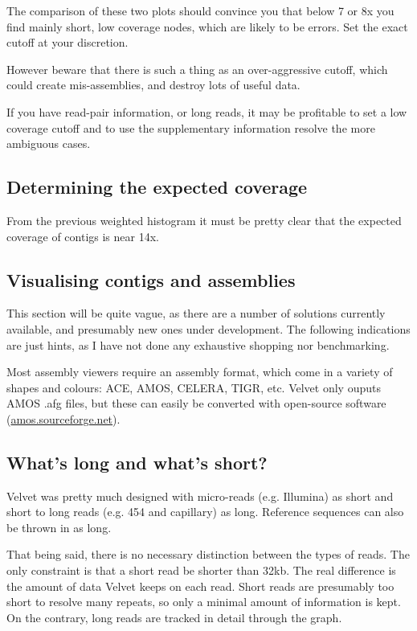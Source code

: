 \documentclass{article}
\begin{document}
The comparison of these two plots should convince you that below 7 or 8x you find mainly short, low coverage nodes, which are likely to be errors. Set the exact cutoff at your discretion.

However beware that there is such a thing as an over-aggressive cutoff, which could create mis-assemblies, and destroy lots of useful data.

If you have read-pair information, or long reads, it may be profitable to set a low coverage cutoff and to use the supplementary information resolve the more ambiguous cases.

\subsection{Determining the expected coverage}

\label{sec:expcov}

From the previous weighted histogram it must be pretty clear that the expected coverage of contigs is near 14x. 

\subsection{Visualising contigs and assemblies}

This section will be quite vague, as there are a number of solutions currently available, and presumably new ones under development. The following indications are just hints, as I have not done any exhaustive shopping nor benchmarking.

Most assembly viewers require an assembly format, which come in a variety of shapes and colours: ACE, AMOS, CELERA, TIGR, etc. Velvet only ouputs AMOS .afg files, but these can easily be converted with open-source software (\href{http://amos.sourceforge.net}{amos.sourceforge.net}).

\subsection{What's long and what's short?}

Velvet was pretty much designed with micro-reads (e.g. Illumina) as short and short to long reads (e.g. 454 and capillary) as long. Reference sequences can also be thrown in as long.

That being said, there is no necessary distinction between the types of reads. The only constraint is that a short read be shorter than 32kb. The real difference is the amount of data Velvet keeps on each read. Short reads are presumably too short to resolve many repeats, so only a minimal amount of information is kept. On the contrary, long reads are tracked in detail through the graph.
\end{document}
